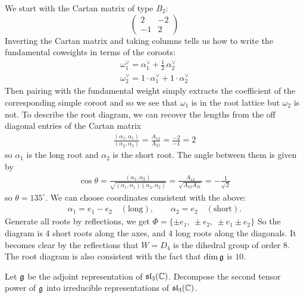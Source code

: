 \documentclass[12pt]{article}
\begin{document}
\begin{solution}
    We start with the Cartan matrix of type $B_2$:
    \[\begin{pmatrix}
            2  & -2 \\
            -1 & 2
        \end{pmatrix}\] Inverting the Cartan matrix and taking columns tells us how to write the fundamental coweights in terms of the coroots:
    \begin{align*}
        \omega_1^\vee = \alpha_1^\vee + \tfrac12\,\alpha_2^\vee \\
        \omega_2^\vee = 1\cdot \alpha_1^\vee + 1\cdot \alpha_2^\vee
    \end{align*} Then pairing with the fundamental weight simply extracts the coefficient of the corresponding simple coroot and so we see that $\omega_1$ is in the root lattice but $\omega_2$ is not.
    To describe the root diagram, we can recover the lengths from the off diagonal entries of the Cartan matrix \begin{align*}
        \frac{(\alpha_1,\alpha_1)}{(\alpha_2,\alpha_2)}=\frac{A_{12}}{A_{21}}=\frac{-2}{-1}=2
    \end{align*} so $\alpha_1$ is the long root and $\alpha_2$ is the short root. The angle between them is given by \begin{align*}
        \cos \theta = \frac{(\alpha_1,\alpha_2)}{\sqrt{(\alpha_1,\alpha_1)(\alpha_2,\alpha_2)}} = \frac{A_{12}}{\sqrt{A_{12}A_{21}}} = -\frac{1}{\sqrt{2}}
    \end{align*} so $\theta = 135^\circ$. We can choose coordinates consistent with the above:
    \begin{align*}
        \alpha_1 = e_1 - e_2 \quad (\text{long}),\qquad
        \alpha_2 = e_2 \quad (\text{short}).
    \end{align*}
    Generate all roots by reflections, we get $\Phi=\{\pm e_1,\ \pm e_2,\ \pm e_1\pm e_2\}$
    So the diagram is 4 short roots along the axes, and 4 long roots along the diagonals. It becomes clear by the reflections that $W = D_4$ is the dihedral group of order $8$. The root diagram is also consistent with the fact that $\dim \mf g$ is $10$.
\end{solution}

\begin{exercise}
    Let $\mf g$ be the adjoint representation of $\sl_3(\mathbb C)$. Decompose the second tensor power of $\mf g$ into irreducible representations of $\sl_3(\mathbb C)$.
\end{exercise}
\end{document}
